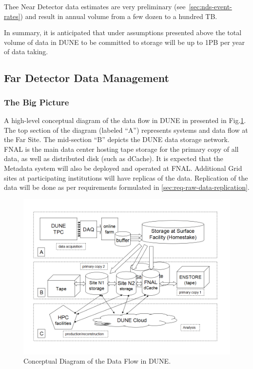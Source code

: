 Thee Near Detector data estimates are very preliminary (see~\ref{sec:nds-event-rates}) and result in annual
volume from a few dozen to a hundred TB.

In summary, it is anticipated that under assumptions presented above the total volume of data in DUNE to be
committed to storage will be up to 1PB per year of data taking.

\subsection{Far Detector Data Management}
\subsubsection{The Big Picture}
A high-level conceptual diagram of the data flow in DUNE in presented in Fig.\ref{fig:DUNEdataflow}.
The top section of the diagram (labeled ``A'') represents systems and data flow at the Far Site.
The mid-section ``B'' depicts the DUNE data storage network. FNAL is the main data center
hosting tape storage for the primary copy of all data, as well as distributed disk (such as dCache).
It is expected that the Metadata system will also be deployed and operated at FNAL.
Additional Grid sites at participating institutions will have replicas of the data.
Replication of the data will be done as per requirements formulated in \ref{sec:req-raw-data-replication}.

\begin{figure}[h!]
\centering
\includegraphics[width=\textwidth]{DUNEdataflow.png}
\caption{Conceptual Diagram of the Data Flow in DUNE.}
\label{fig:DUNEdataflow}
\end{figure}

